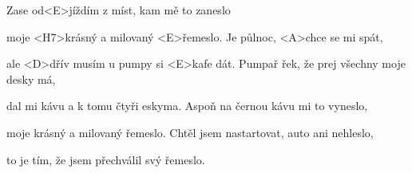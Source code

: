 
\zs

Zase od<E>jíždím z míst, kam mě to zaneslo

moje <H7>krásný a milovaný <E>řemeslo.
\ks
\zr
Je půlnoc, <A>chce se mi spát,

ale <D>dřív musím u pumpy si <E>kafe dát.
\kr
\zs
Pumpař řek, že prej všechny moje desky má,

dal mi kávu a k tomu čtyři eskyma.
\ks
\zr \kr
\zs
Aspoň na černou kávu mi to vyneslo,

moje krásný a milovaný řemeslo.
\ks
\zr \kr
\zs
Chtěl jsem nastartovat, auto ani nehleslo,

to je tím, že jsem přechválil svý řemeslo.
\ks
\zr \kr
\kp
